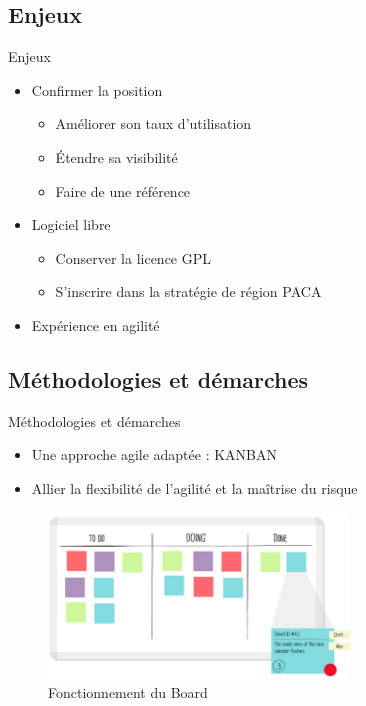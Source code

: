 \subsection{Enjeux}
\JulianSpeak
\begin{frame}{Enjeux}
\begin{itemize}
	\item Confirmer la position
	\begin{itemize}
		\item Améliorer son taux d'utilisation
		\item Étendre sa visibilité
		\item Faire de  une référence
	\end{itemize}
	\vfill
	\pause
	\item Logiciel libre
		\begin{itemize}
			\item Conserver la licence GPL
			\item S'inscrire dans la stratégie de région PACA
		\end{itemize}
			\vfill
	\pause			
	\item Expérience en agilité
\end{itemize}
\end{frame}
\subsection{Méthodologies et démarches}
\begin{frame}{Méthodologies et démarches}
	\begin{itemize}
		\item Une approche agile adaptée : KANBAN
		\item Allier la flexibilité de l'agilité et la maîtrise du risque
	\end{itemize}
	\begin{figure}[H]
		\includegraphics[width=8cm]{kanban.png}
		\caption{Fonctionnement du Board}
	\end{figure}
\end{frame}
\SteveSpeak
